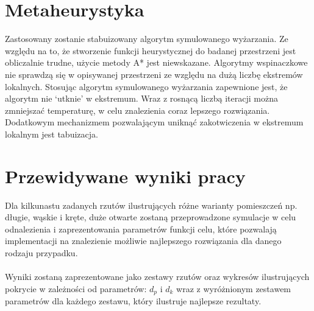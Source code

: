 \documentclass[12pt,a4paper]{article}
\begin{document}
\section{Metaheurystyka}
Zastosowany zostanie stabuizowany algorytm symulowanego wyżarzania.
Ze względu na to, że stworzenie funkcji heurystycznej do badanej przestrzeni jest obliczalnie
trudne, użycie metody A* jest niewskazane.
Algorytmy wspinaczkowe nie sprawdzą się w opisywanej przestrzeni ze względu na dużą liczbę
ekstremów lokalnych. Stosując algorytm symulowanego wyżarzania zapewnione jest,
że algorytm nie ‘utknie’ w ekstremum. Wraz z rosnącą liczbą iteracji można zmniejszać temperaturę,
w celu znalezienia coraz lepszego rozwiązania. Dodatkowym mechanizmem pozwalającym uniknąć
zakotwiczenia w ekstremum lokalnym jest tabuizacja.
\section{Przewidywane wyniki pracy}
Dla kilkunastu zadanych rzutów ilustrujących różne warianty pomieszczeń np. długie, wąskie i kręte,
duże otwarte zostaną przeprowadzone symulacje w celu odnalezienia i zaprezentowania
parametrów funkcji celu, które pozwalają implementacji na znalezienie możliwie
najlepszego rozwiązania dla danego rodzaju przypadku. \\ \\
Wyniki zostaną zaprezentowane jako zestawy rzutów oraz wykresów
ilustrujących pokrycie w zależności od parametrów: $d_p$ i $d_k$ wraz z wyróżnionym zestawem
parametrów dla każdego zestawu, który ilustruje najlepsze rezultaty.
\end{document}
